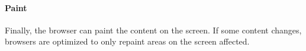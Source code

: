 





\paragraph{Paint}

Finally, the browser can paint the content on the screen.
If some content changes, browsers are optimized to only repaint areas on the screen affected.  %



















